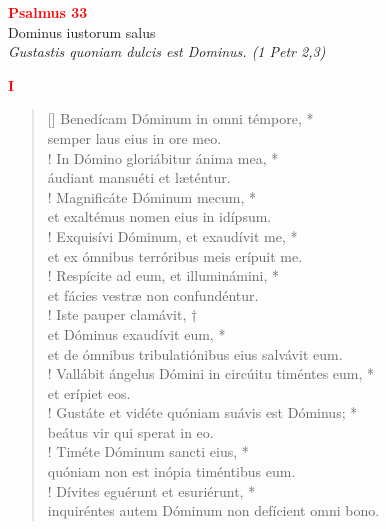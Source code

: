 


\def\greinitialformat#1{%
{\fontsize{39}{39}\selectfont #1}%
}




\vspace{0.3cm}
\begin{center}
 \textcolor{red}{\large \bf Psalmus 33}\\
Dominus iustorum salus\\
\textit{\small Gustastis quoniam dulcis est Dominus. (1 Petr 2,3)}
\end{center}
\begin{center}
\textcolor{red}{\bf I}
\end{center}
\begin{verse}[\versewidth]
Benedícam Dóminum in omni témpore, *\\
semper laus eius in ore meo.\\!
\vin In Dómino gloriábitur ánima mea, *\\
\vin áudiant mansuéti et læténtur.\\!
Magnificáte Dóminum mecum, *\\
et exaltémus nomen eius in idípsum.\\!
\vin Exquisívi Dóminum, et exaudívit me, *\\
\vin et ex ómnibus terróribus meis erípuit me.\\!
Respícite ad eum, et illuminámini, *\\
et fácies vestræ non confundéntur.\\!
\vin Iste pauper clamávit, †\\
\vin et Dóminus exaudívit eum, *\\
\vin et de ómnibus tribulatiónibus eius salvávit eum.\\!
Vallábit ángelus Dómini in circúitu timéntes eum, *\\
et erípiet eos.\\!
\vin Gustáte et vidéte quóniam suávis est Dóminus; *\\
\vin beátus vir qui sperat in eo.\\!
Timéte Dóminum sancti eius, *\\
quóniam non est inópia timéntibus eum.\\!
\vin Dívites eguérunt et esuriérunt, *\\
\vin inquiréntes autem Dóminum non defícient omni bono.\\
\end{verse}
